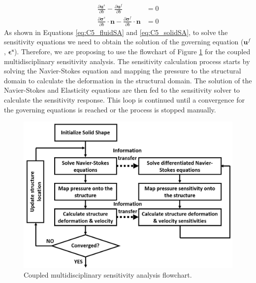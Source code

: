 %
%
\begin{subequations}\label{eq:C5_FSIconstraintsSA}
\begin{align}
	\frac{\partial \mathbf{u}^s}{\partial b} - 
	\frac{\partial \mathbf{u}^f}{\partial b} &= 0
	\\
	\frac{\partial \mathbf{\sigma}^s}{\partial b} \cdot \mathbf{n} - 
	\frac{\partial \mathbf{\sigma}^f}{\partial b} \cdot \mathbf{n} &= 0
\end{align}
\end{subequations}
%
As shown in Equations \eqref{eq:C5_fluidSA} and \eqref{eq:C5_solidSA}, to solve the sensitivity equations we need to obtain the solution of the governing equation ($\mathbf{u}^f$, $\mathbf{\epsilon^s}$). Therefore, we are proposing to use the flowchart of Figure \ref{fig:C5_SAflowchart} for the coupled multidisciplinary sensitivity analysis. The sensitivity calculation process starts by solving the Navier-Stokes equation and mapping the pressure to the structural domain to calculate the deformation in the structural domain. The solution of the Navier-Stokes and Elasticity equations are then fed to the sensitivity solver to calculate the sensitivity response. This loop is continued until a convergence for the governing equations is reached or the process is stopped manually. 
%
\begin{figure}[H]
    \centering
    \includegraphics[width=14.00cm]{Chapter_5/figure/couple_SA_flowchart.jpg}
    \caption{Coupled multidisciplinary sensitivity analysis flowchart.}
    \label{fig:C5_SAflowchart}
\end{figure}
%